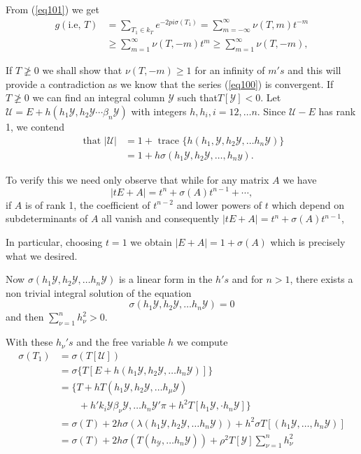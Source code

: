 From (\ref{eq101}) we get
\begin{align*}
g(\text{i.e, } T) & = \sum _{T_1 \in k_T}e^{-2 pi \sigma (T_1)}= \sum ^\infty
_{ m = - \infty} \nu (T ,m)t^{-m}\\ 
& \ge \sum ^\infty _{m=1} \nu (T,-m)t^m \ge \sum ^\infty _{m=1} \nu
(T,-m), 
\end{align*}

If $T \ngeq 0$ we shall show that $\nu (T,-m)\ge 1$ for an infinity of
$m's$ and this will provide a contradiction as we know that
the series (\ref{eq100}) is convergent. If $T \ngeq 0$ we can find an
integral column $\mathscr{Y}$ such
 that\pageoriginale $T[\mathcal{Y}]<0$. Let
$\mathcal{U}=E+ h(h_1 \mathcal{Y},h_2 \mathcal{Y} \cdots \beta _n
\mathcal{Y})$ with integers $h,h_i,i=12,\ldots n$. Since
$\mathcal{U}-E$ has rank 1, we contend  
\begin{align*}
\text{ that } |\mathcal{U}|&= 1+ \text{ trace } \{ h (h_1,
\mathcal{Y},h_2 \mathcal{Y}, \ldots h_n \mathcal{Y})\}\\ 
&= 1+h \sigma (h_1\mathcal{Y},h_2 \mathcal{Y}, \ldots, h_n y).
\end{align*}

To verify this we need only observe that while for any matrix $A$ we
have 
$$
|t E+A|=t^n+ \sigma (A)t^{n-1}+ \cdots,
$$
if $A$ is of rank 1, the coefficient of $t^{n-2}$ and lower powers
of $t$ which depend on subdeterminants of $A$ all vanish and
consequently $|t E +A|= t^n + \sigma (A)t^{n-1}$, 

In particular, choosing $t=1$ we obtain $|E+A| =1+ \sigma (A)$ which
is precisely what we desired. 

Now $\sigma (h_1 \mathcal{Y}, h_2 \mathcal{Y}, \ldots h_n
\mathcal{Y})$ is a linear form in the $h's$ and for $n >1$,
there exists a non trivial integral solution of the equation 
$$
\sigma (h_1 \mathcal{Y}, h_2 \mathcal{Y}, \ldots h_n \mathcal{Y})=0
$$
and then $\sum^n_{\nu= 1} h^2_\nu >0$.

With these $h_\nu's$ and the free variable $h$ we compute 
\begin{align*}
\sigma (T_1)&= \sigma (T[\mathcal{U}])\\
&=\sigma \{ T[E+h(h_1 \mathcal{Y},h_2 \mathcal{Y},\ldots h_n
  \mathcal{Y})]\}\\ 
&= \{ T+h T(h_1 \mathcal{Y},h_2 \mathcal{Y} ,\ldots h_\mu
\mathcal{Y})\\
& \qquad +h'k_i \mathcal{Y} \beta _\nu \mathcal{Y}, \ldots h_n
\mathcal{Y'} \pi + h^2 T[h_1 \mathcal{Y}, \cdot h_n \mathcal{Y}] \}\\ 
&= \sigma (T)+2 h \sigma (\lambda (h_1 \mathcal{Y},h_2 \mathcal{Y},
\ldots h_n \mathcal{Y}))+ h^2 \sigma T[(h_1 \mathcal{Y}, \ldots ,h_n
  \mathcal{Y})]\\ 
&= \sigma (T)+2 h \sigma (T(h_ \mathcal{Y},\ldots h_n
\mathcal{Y}))+\rho^2 T[\mathcal{Y}] \sum^n _{\nu=1} h^2_\nu 
\end{align*}

